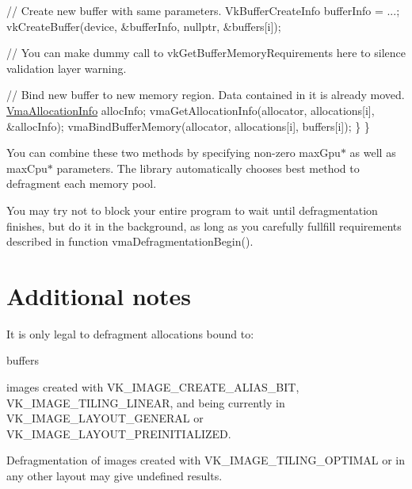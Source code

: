 \begin{DoxyCode}
        \textcolor{comment}{// Create new buffer with same parameters.}
        VkBufferCreateInfo bufferInfo = ...;
        vkCreateBuffer(device, &bufferInfo, \textcolor{keyword}{nullptr}, &buffers[i]);

        \textcolor{comment}{// You can make dummy call to vkGetBufferMemoryRequirements here to silence validation layer
       warning.}

        \textcolor{comment}{// Bind new buffer to new memory region. Data contained in it is already moved.}
        \hyperlink{structVmaAllocationInfo}{VmaAllocationInfo} allocInfo;
        vmaGetAllocationInfo(allocator, allocations[i], &allocInfo);
        vmaBindBufferMemory(allocator, allocations[i], buffers[i]);
    \}
\}
\end{DoxyCode}


You can combine these two methods by specifying non-\/zero {\ttfamily max\+Gpu$\ast$} as well as {\ttfamily max\+Cpu$\ast$} parameters. The library automatically chooses best method to defragment each memory pool.

You may try not to block your entire program to wait until defragmentation finishes, but do it in the background, as long as you carefully fullfill requirements described in function vma\+Defragmentation\+Begin().\hypertarget{defragmentation_defragmentation_additional_notes}{}\section{Additional notes}\label{defragmentation_defragmentation_additional_notes}
It is only legal to defragment allocations bound to\+:


\begin{DoxyItemize}
\item buffers
\item images created with {\ttfamily V\+K\+\_\+\+I\+M\+A\+G\+E\+\_\+\+C\+R\+E\+A\+T\+E\+\_\+\+A\+L\+I\+A\+S\+\_\+\+B\+IT}, {\ttfamily V\+K\+\_\+\+I\+M\+A\+G\+E\+\_\+\+T\+I\+L\+I\+N\+G\+\_\+\+L\+I\+N\+E\+AR}, and being currently in {\ttfamily V\+K\+\_\+\+I\+M\+A\+G\+E\+\_\+\+L\+A\+Y\+O\+U\+T\+\_\+\+G\+E\+N\+E\+R\+AL} or {\ttfamily V\+K\+\_\+\+I\+M\+A\+G\+E\+\_\+\+L\+A\+Y\+O\+U\+T\+\_\+\+P\+R\+E\+I\+N\+I\+T\+I\+A\+L\+I\+Z\+ED}.
\end{DoxyItemize}

Defragmentation of images created with {\ttfamily V\+K\+\_\+\+I\+M\+A\+G\+E\+\_\+\+T\+I\+L\+I\+N\+G\+\_\+\+O\+P\+T\+I\+M\+AL} or in any other layout may give undefined results.

